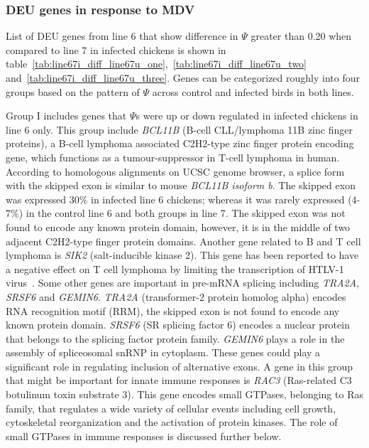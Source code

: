 \documentclass[10pt]{article}
\begin{document}
\subsubsection*{DEU genes in response to MDV}

List of DEU genes from line 6 that show difference in $\Psi$ greater than 0.20 when compared to line 7
in infected chickens is shown in table~\ref{tab:line67i_diff_line67u_one},~\ref{tab:line67i_diff_line67u_two}
and~\ref{tab:line67i_diff_line67u_three}.
Genes can be categorized roughly into four groups based on the pattern of $\Psi$ across control and
infected birds in both lines.

Group I includes genes that $\Psi$s were up or down regulated in infected chickens in line 6 only.
This group include \textit{BCL11B} (B-cell CLL/lymphoma 11B zinc finger proteins), a B-cell lymphoma
associated C2H2-type zinc finger protein encoding gene, which functions as a tumour-suppressor
in T-cell lymphoma in human.
According to homologous alignments on UCSC genome browser, a splice form with the skipped exon
is similar to mouse \textit{BCL11B isoform b}.
The skipped exon was expressed 30\% in infected line 6 chickens; whereas it was rarely expressed
(4-7\%) in the control line 6 and both groups in line 7.
The skipped exon was not found to encode any known protein domain, however, it is in the middle of
two adjacent C2H2-type finger protein domains.
Another gene related to B and T cell lymphoma is \textit{SIK2} (salt-inducible kinase 2).
This gene has been reported to have a negative effect on T cell lymphoma by limiting the transcription of
HTLV-1 virus~\cite{tang2013lkb1}.
Some other genes are important in pre-mRNA splicing including \textit{TRA2A}, \textit{SRSF6} and \textit{GEMIN6}.
\textit{TRA2A} (transformer-2 protein homolog alpha) encodes RNA recognition motif (RRM),
the skipped exon is not found to encode any known protein domain.
\textit{SRSF6} (SR splicing factor 6) encodes a nuclear protein that belongs to the splicing factor protein family.
\textit{GEMIN6} plays a role in the assembly of spliceosomal snRNP in cytoplasm.
These genes could play a significant role in regulating inclusion of alternative exons.
A gene in this group that might be important for innate immune responses is \textit{RAC3} (Ras-related C3
botulinum toxin substrate 3).
This gene encodes small GTPases, belonging to Ras family, that regulates a wide variety of cellular events
including cell growth, cytoskeletal reorganization and the activation of protein kinases.
The role of small GTPases in immune responses is discussed further below.
\end{document}
